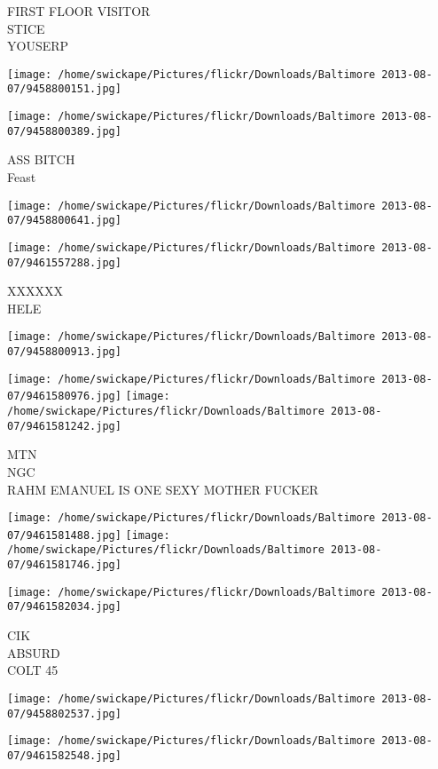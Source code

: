 \documentclass[10pt,letterpaper]{article}
\begin{document}
FIRST FLOOR VISITOR\\
STICE\\
YOUSERP
\pagebreak

\texttt{[image: /home/swickape/Pictures/flickr/Downloads/Baltimore 2013-08-07/9458800151.jpg]}

\vspace{0.25in}
\texttt{[image: /home/swickape/Pictures/flickr/Downloads/Baltimore 2013-08-07/9458800389.jpg]}

ASS BITCH\\
Feast
\pagebreak

\texttt{[image: /home/swickape/Pictures/flickr/Downloads/Baltimore 2013-08-07/9458800641.jpg]}

\vspace{0.25in}
\texttt{[image: /home/swickape/Pictures/flickr/Downloads/Baltimore 2013-08-07/9461557288.jpg]}

XXXXXX\\
HELE
\pagebreak

\texttt{[image: /home/swickape/Pictures/flickr/Downloads/Baltimore 2013-08-07/9458800913.jpg]}

\vspace{0.25in}
\texttt{[image: /home/swickape/Pictures/flickr/Downloads/Baltimore 2013-08-07/9461580976.jpg]}
\texttt{[image: /home/swickape/Pictures/flickr/Downloads/Baltimore 2013-08-07/9461581242.jpg]}

MTN\\
NGC\\
RAHM EMANUEL IS ONE SEXY MOTHER FUCKER
\pagebreak

\texttt{[image: /home/swickape/Pictures/flickr/Downloads/Baltimore 2013-08-07/9461581488.jpg]}
\texttt{[image: /home/swickape/Pictures/flickr/Downloads/Baltimore 2013-08-07/9461581746.jpg]}

\vspace{0.25in}
\texttt{[image: /home/swickape/Pictures/flickr/Downloads/Baltimore 2013-08-07/9461582034.jpg]}

CIK\\
ABSURD\\
COLT 45
\pagebreak

\texttt{[image: /home/swickape/Pictures/flickr/Downloads/Baltimore 2013-08-07/9458802537.jpg]}

\vspace{0.25in}
\texttt{[image: /home/swickape/Pictures/flickr/Downloads/Baltimore 2013-08-07/9461582548.jpg]}
\end{document}
